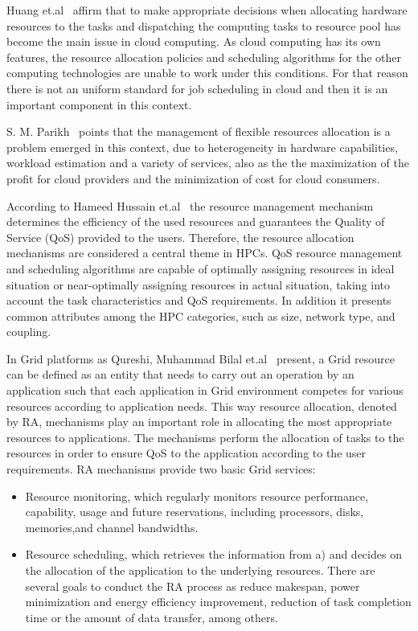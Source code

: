 Huang et.al~\cite{survey_1} affirm that to make appropriate decisions when allocating hardware resources to the tasks and dispatching the computing tasks to resource pool has become the main issue in cloud computing. As cloud computing has its own features, the resource allocation policies and scheduling algorithms for the other computing technologies are unable to work under this conditions. For that reason there is not an uniform standard for job scheduling in cloud and then it is an important component in this context. 

S. M. {Parikh}~\cite{survey_3} points that the management of flexible resources allocation is a problem emerged in this context, due to heterogeneity in hardware capabilities, workload estimation and a variety of services, also as the the maximization of the profit for cloud providers and the minimization of cost for cloud consumers.

According to Hameed Hussain et.al~\cite{survey_2} the resource management mechanism determines the efficiency of the used resources and guarantees the Quality of Service (QoS) provided to the users. Therefore, the resource allocation mechanisms are considered a central theme in HPCs. QoS resource management and scheduling algorithms are capable of optimally assigning resources in ideal situation or near-optimally assigning resources in actual situation, taking into account the task characteristics and QoS requirements. In addition it presents common attributes among the HPC categories, such as size, network type, and coupling.

In Grid platforms as Qureshi, Muhammad Bilal et.al~\cite{survey_grid} present, a Grid resource can be defined as an entity that needs to carry out an operation by an application such that each application in Grid environment competes for various resources according to application needs. This way resource allocation, denoted by RA, mechanisms play an important role in allocating the most appropriate resources to applications. The mechanisms perform the allocation of tasks to the resources in order to ensure QoS to the application according to the user requirements. RA mechanisms provide two basic Grid services: 

\begin{itemize}

    \item Resource monitoring, which regularly monitors resource performance, capability, usage and future reservations, including processors, disks, memories,and channel bandwidths.
    
    \item Resource scheduling, which retrieves the information from a) and decides on the allocation of the application to the underlying resources. There are several goals to conduct the RA process as reduce makespan, power minimization and energy efficiency improvement, reduction of task completion time or the amount of data transfer, among others.
    
\end{itemize}

